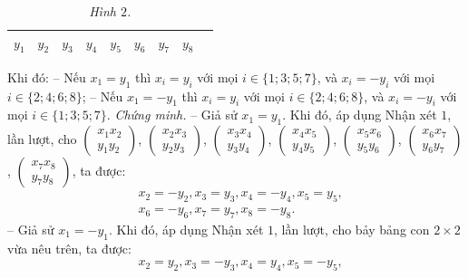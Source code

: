 \begin{multicols}{2}
\begin{table}[H]
\begin{tabular}{|c|c|c|c|c|c|c|c|c|}
			\hline
			$y_1$ & $y_2$ & $y_3$ & $y_4$ & $y_5$ & $y_6$ & $y_7$ & $y_8$ \\
			\hline
		\end{tabular}
		\caption{\small\textit{\color{thachthuctoanhoc}Hình $2$.}}
		\vspace*{-10pt}
	\end{table}
	Khi đó:
	\vskip 0.05cm
	-- Nếu ${x_1} = {y_1}$ thì ${x_i} = {y_i}$  với mọi $i \in  \{1; 3; 5; 7\}$, và ${x_i} =  - {y_i}$  với mọi $i \in  \{2; 4; 6; 8\}$;
	\vskip 0.05cm
	-- Nếu ${x_1} =  - {y_1}$ thì ${x_i} = {y_i}$ với mọi $i \in  \{2; 4; 6; 8\}$, và  ${x_i} =  - {y_i}$ với mọi $i \in  \{1; 3; 5; 7\}$.
	\vskip 0.05cm
	\textit{Chứng minh.}
	\vskip 0.05cm
	-- Giả sử  $x_1 = y_1$. Khi đó, áp dụng Nhận xét $1$, lần lượt, cho  $\left( \begin{array}{l}
		{x_1}{x_2}\\
		{y_1}{y_2}
	\end{array} \right)$,  $\left( \begin{array}{l}
	{x_2}{x_3}\\
	{y_2}{y_3}
\end{array} \right)$,  $\left( \begin{array}{l}
{x_3}{x_4}\\
{y_3}{y_4}
\end{array} \right)$,
$\left( \begin{array}{l}
	{x_4}{x_5}\\
	{y_4}{y_5}
\end{array} \right)$,
 $\left( \begin{array}{l}
{x_5}{x_6}\\
{y_5}{y_6}
\end{array} \right)$,  $\left( \begin{array}{l}
{x_6}{x_7}\\
{y_6}{y_7}
\end{array} \right)$,  $\left( \begin{array}{l}
{x_7}{x_8}\\
{y_7}{y_8}
\end{array} \right)$,  ta được:
	\begin{align*}
		&{x_2} =  - {y_2}, x_3 = y_3, x_4 = - y_4, x_5 = y_5,\\
		&x_6 = -y_6, x_7 = y_7, x_8 = -y_8.
	\end{align*}
	-- Giả sử  $x_1 = -y_1$. Khi đó, áp dụng Nhận xét $1$, lần lượt, cho bảy bảng con $2 \times  2$ vừa nêu trên, ta được:
	\begin{align*}
		&x_2 = y_2, x_3 = -y_3, x_4 = y_4, x_5 = -y_5,\\

\end{align*}
\end{multicols}
